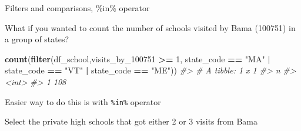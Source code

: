 \documentclass[8pt,ignorenonframetext,]{beamer}
\newenvironment{Shaded}{\begin{snugshade}}{\end{snugshade}}
\newcommand{\KeywordTok}[1]{\textcolor[rgb]{0.13,0.29,0.53}{\textbf{#1}}}
\newcommand{\DecValTok}[1]{\textcolor[rgb]{0.00,0.00,0.81}{#1}}
\newcommand{\StringTok}[1]{\textcolor[rgb]{0.31,0.60,0.02}{#1}}
\newcommand{\CommentTok}[1]{\textcolor[rgb]{0.56,0.35,0.01}{\textit{#1}}}
\newcommand{\OperatorTok}[1]{\textcolor[rgb]{0.81,0.36,0.00}{\textbf{#1}}}
\newcommand{\NormalTok}[1]{#1}
\begin{document}
\begin{frame}[fragile]{Filters and comparisons, \%in\% operator}

What if you wanted to count the number of schools visited by Bama
(100751) in a group of states?

\begin{Shaded}
\begin{Highlighting}[]
\KeywordTok{count}\NormalTok{(}\KeywordTok{filter}\NormalTok{(df_school,visits_by_}\DecValTok{100751} \OperatorTok{>=}\StringTok{ }\DecValTok{1}\NormalTok{, state_code }\OperatorTok{==}\StringTok{ "MA"} \OperatorTok{|}\StringTok{ }\NormalTok{state_code }\OperatorTok{==}\StringTok{ "VT"} \OperatorTok{|}\StringTok{ }\NormalTok{state_code }\OperatorTok{==}\StringTok{ "ME"}\NormalTok{))}
\CommentTok{#> # A tibble: 1 x 1}
\CommentTok{#>       n}
\CommentTok{#>   <int>}
\CommentTok{#> 1   108}
\end{Highlighting}
\end{Shaded}

Easier way to do this is with \texttt{\%in\%} operator

\begin{Shaded}
\end{Shaded}

Select the private high schools that got either 2 or 3 visits from Bama

\begin{Shaded}
\end{Shaded}

\end{frame}
\end{document}
